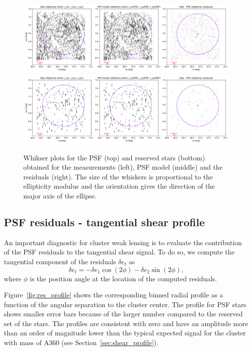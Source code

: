 \documentclass[SE,lsstdraft,authoryear,toc]{lsstdoc}
\begin{document}
\begin{figure}
\includegraphics[width=\textwidth]{Figures/whiskers_used.png}
\includegraphics[width=\textwidth]{Figures/whiskers_reserved.png}
\caption{Whikser plots for the PSF (top) and reserved stars (bottom) obtained for the measurements (left), PSF model (middle) and the residuals (right). The size of the whiskers is proportional to the ellipticity modulus and the orientation gives the direction of the major axis of the ellipse. \label{fig:whiskers}}
\end{figure}

\subsection{PSF residuals - tangential shear profile}

An important diagnostic for cluster weak lensing is to evaluate the contribution of the PSF residuals to the tangential shear signal. To do so, we compute the tangential component of the residuals $\delta e_t$ as 
\begin{equation}
\delta e_t = - \delta e_1  \cos(2 \phi) - \delta e_2  \sin(2 \phi),
\end{equation}
where $\phi$ is the position angle at the location of the computed residuals.

Figure~{\ref{fig:res_profile}} shows the corresponding binned radial profile as a function of the angular separation to the cluster center. The profile for PSF stars shows smaller error bars because of the larger number compared to the reserved set of the stars. The profiles are consistent with zero and have an amplitude more than an order of magnitude lower than the typical expected signal for the cluster with mass of A360 (see Section~\ref{sec:shear_profile}). 
\end{document}
